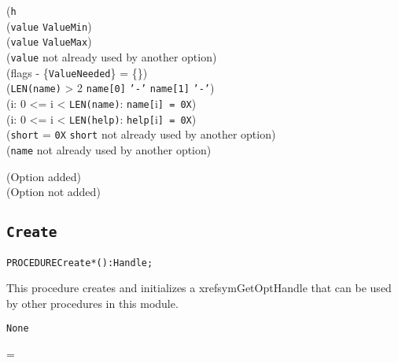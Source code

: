 \begin{precondition}
(\texttt{h} \neq \nil \logicaland {} \logicaland \\
  (\texttt{value} \geq \texttt{ValueMin}) \logicaland \\
  (\texttt{value} \leq \texttt{ValueMax}) \logicaland \\
  (\texttt{value} \textrm{ not already used by another option}) \logicaland \\
  (flags - \{\texttt{ValueNeeded}\} = \{\}) \logicaland \\
  (\texttt{LEN(name)} > 2 \logicaland
  \texttt{name[0]} \neq \texttt{'-'} \logicaland
  \texttt{name[1]} \neq \texttt{'-'}) \logicaland \\
  (\exists i: 0 <= i < \texttt{LEN(name)}: \texttt{name[}i\texttt{] = 0X}) \logicaland \\
  (\exists i: 0 <= i < \texttt{LEN(help)}: \texttt{help[}i\texttt{] = 0X})  \logicaland \\
  (\texttt{short} = \texttt{0X} \logicalor \texttt{short} \textrm{ not
    already used by another option}) \logicaland \\
  (\texttt{name} \textrm{ not already used by another option})
\end{precondition}

\begin{postcondition}
  (\result \implies \textrm{Option added}) \logicalor \\
  (\logicalnot \result \implies \textrm{Option not added})
\end{postcondition}

\subsection{\texttt{Create}}\label{GetOpt:Create}
\begin{alltt}
PROCEDURE Create*() : Handle;
\end{alltt}

\begin{semantics}
This procedure creates and initializes a xrefsym{GetOpt}{Handle} that
can be used by other procedures in this module.
\end{semantics}

\begin{precondition}
\texttt{None}
\end{precondition}

\begin{postcondition}
  \result = \nil \logicalor \validfn{\result\deref}
\end{postcondition}

